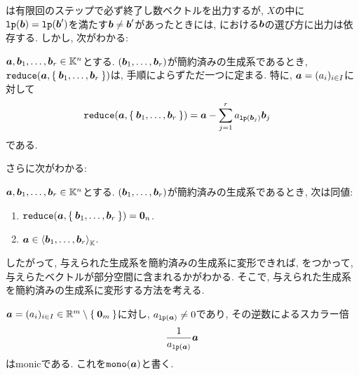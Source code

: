は有限回のステップで必ず終了し数ベクトルを出力するが,
$X$の中に
$\lp(\bbb)=\lp(\bbb')$を満たす$\bbb\neq \bbb'$があったときには,
における$\bbb$の選び方に出力は依存する.
しかし, 次がわかる:
\begin{prop}
  $\aaa,\bbb_1,\ldots,\bbb_r\in \KK^n$とする.
  $(\bbb_1,\ldots,\bbb_r)$が簡約済みの生成系であるとき,
  $\reduce(\aaa,\Set{\bbb_1,\ldots,\bbb_r})$は,
  手順によらずただ一つに定まる.
  特に,
  $\aaa=(a_i)_{i \in I}$に対して
  \begin{align*}
    \reduce(\aaa,\Set{\bbb_1,\ldots,\bbb_r})
    &=
    \aaa-\sum_{j=1}^{r} a_{\lp(\bbb_j)}\bbb_j
  \end{align*}
  である.
\end{prop}
さらに次がわかる:
\begin{prop}
  $\aaa,\bbb_1,\ldots,\bbb_r\in \KK^n$とする.
  $(\bbb_1,\ldots,\bbb_r)$が簡約済みの生成系であるとき,
  次は同値:
  \begin{enumerate}
  \item $\reduce(\aaa,\Set{\bbb_1,\ldots,\bbb_r})=\zzero_n$.
  \item $\aaa\in \Braket{\bbb_1,\ldots,\bbb_r}_{\KK}$.
  \end{enumerate}
\end{prop}


したがって, 与えられた生成系を簡約済みの生成系に変形できれば,
をつかって,
与えらたベクトルが部分空間に含まれるかがわかる.
そこで,
与えられた生成系を簡約済みの生成系に変形する方法を考える.

$\aaa=(a_i)_{i\in I}\in \RR^m\setminus\Set{\zzero_{m}}$に対し,
$a_{\lp(\aaa)}\neq 0$であり, その逆数によるスカラー倍
\begin{align*}
  \frac{1}{a_{\lp(\aaa)}}\aaa
\end{align*}
はmonicである.
これを$\mono(\aaa)$と書く.

